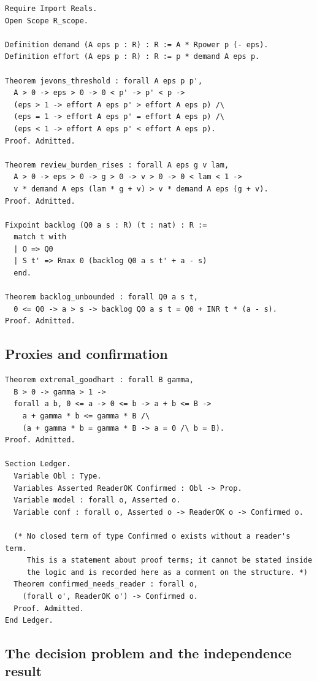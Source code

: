 \documentclass[11pt]{article}
\theoremstyle{plain}
\theoremstyle{definition}
\theoremstyle{remark}
\begin{document}
\begin{lstlisting}
Require Import Reals.
Open Scope R_scope.

Definition demand (A eps p : R) : R := A * Rpower p (- eps).
Definition effort (A eps p : R) : R := p * demand A eps p.

Theorem jevons_threshold : forall A eps p p',
  A > 0 -> eps > 0 -> 0 < p' -> p' < p ->
  (eps > 1 -> effort A eps p' > effort A eps p) /\
  (eps = 1 -> effort A eps p' = effort A eps p) /\
  (eps < 1 -> effort A eps p' < effort A eps p).
Proof. Admitted.

Theorem review_burden_rises : forall A eps g v lam,
  A > 0 -> eps > 0 -> g > 0 -> v > 0 -> 0 < lam < 1 ->
  v * demand A eps (lam * g + v) > v * demand A eps (g + v).
Proof. Admitted.

Fixpoint backlog (Q0 a s : R) (t : nat) : R :=
  match t with
  | O => Q0
  | S t' => Rmax 0 (backlog Q0 a s t' + a - s)
  end.

Theorem backlog_unbounded : forall Q0 a s t,
  0 <= Q0 -> a > s -> backlog Q0 a s t = Q0 + INR t * (a - s).
Proof. Admitted.
\end{lstlisting}

\subsection{Proxies and confirmation}

\begin{lstlisting}
Theorem extremal_goodhart : forall B gamma,
  B > 0 -> gamma > 1 ->
  forall a b, 0 <= a -> 0 <= b -> a + b <= B ->
    a + gamma * b <= gamma * B /\
    (a + gamma * b = gamma * B -> a = 0 /\ b = B).
Proof. Admitted.

Section Ledger.
  Variable Obl : Type.
  Variables Asserted ReaderOK Confirmed : Obl -> Prop.
  Variable model : forall o, Asserted o.
  Variable conf : forall o, Asserted o -> ReaderOK o -> Confirmed o.

  (* No closed term of type Confirmed o exists without a reader's term.
     This is a statement about proof terms; it cannot be stated inside
     the logic and is recorded here as a comment on the structure. *)
  Theorem confirmed_needs_reader : forall o,
    (forall o', ReaderOK o') -> Confirmed o.
  Proof. Admitted.
End Ledger.
\end{lstlisting}

\subsection{The decision problem and the independence result}
\end{document}
